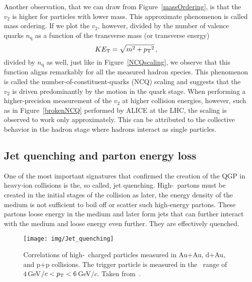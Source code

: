 Another observation, that we can draw from Figure~\ref{massOrdering}, is that the $v_2$ is higher for particles with lower mass. This approximate phenomenon is called mass ordering. 
If we plot the $v_2$, however, divided by the number of valence quarks $n_\mathrm{q}$ as a function of the transverse mass (or transverse energy)
\begin{equation}
 K E_\mathrm{T}  = \sqrt{m^2 + {p_{\mathrm{T}}}^2}\,,
\end{equation}
divided by $n_\mathrm{q}$ as well, just like in Figure~\ref{NCQscaling}, we observe that this function aligns remarkably for all the measured hadron species. This phenomenon is called the number-of-constituent-quarks (NCQ) scaling and suggests that the $v_2$ is driven predominantly by the motion in the quark stage. When performing a higher-precision measurement of the $v_2$ at higher collision energies, however, such as in Figure~\ref{brokenNCQ} performed by ALICE at the LHC, the scaling is observed to work only approximately. This can be attributed to the collective behavior in the hadron stage where hadrons interact as single particles.



\subsection{Jet quenching and parton energy loss}

One of the most important signatures that confirmed the creation of the QGP in heavy-ion collisions is the, so called, jet quenching. High-\pt\ partons must be created in the initial stages of the collision as later, the energy density of the medium is not sufficient to boil off or scatter such high-energy partons. These partons loose energy in the medium and later form jets that can further interact with the medium and loose energy even further. They are effectively quenched.

\begin{figure}[!htb]
\centering
\texttt{[image: img/Jet\_quenching]}
\caption[Correlations of high-\pt\ charged particles measured in Au+Au, d+Au, and p+p collisions.]{\label{jetQuenching}Correlations of high-\pt\ charged particles measured in Au+Au, d+Au, and p+p collisions. The trigger particle is measured in the \pt\ range of $4\,$GeV$/c < {p_{\mathrm{T}}} < 6\,$GeV$/c$\@. Taken from~\cite{jetQuenching }\@.}

\end{figure}


